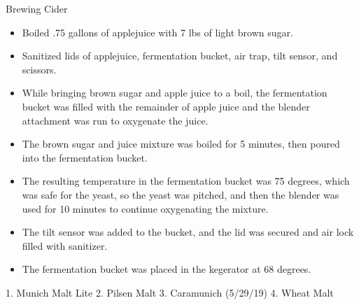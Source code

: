 Brewing Cider

\begin{itemize}
    \item Boiled .75 gallons of applejuice with 7 lbs of light brown sugar.
    \item Sanitized lids of applejuice, fermentation bucket, air trap, tilt sensor, and scissors.
    \item While bringing brown sugar and apple juice to a boil, the fermentation bucket was filled with the remainder of apple juice and the blender attachment was run to oxygenate the juice.
    \item The brown sugar and juice mixture was boiled for 5 minutes, then poured into the fermentation bucket.
    \item The resulting temperature in the fermentation bucket was 75 degrees, which was safe for the yeast, so the yeast was pitched, and then the blender was used for 10 minutes to continue oxygenating the mixture.
    \item The tilt sensor was added to the bucket, and the lid was secured and air lock filled with sanitizer.
    \item The fermentation bucket was placed in the kegerator at 68 degrees.
\end{itemize}

\def\todaysdate{20190710}
\newday{\todaysdate}\label{\todaysdate}

\FloatBarrier{}
1. Munich Malt Lite
2. Pilsen Malt
3. Caramunich (5/29/19)
4. Wheat Malt

